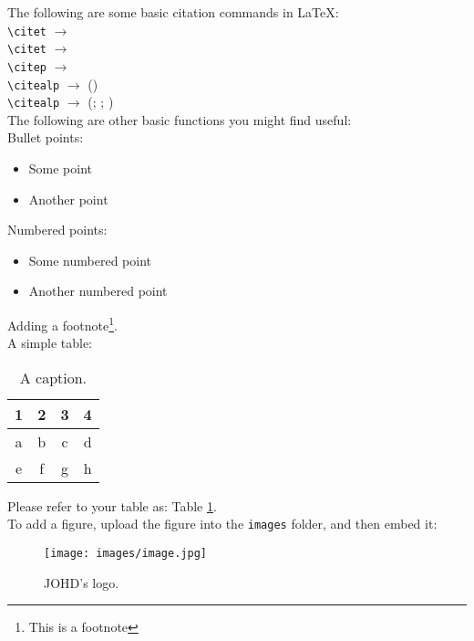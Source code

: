 \documentclass{article}
\begin{document}
\noindent The following are some basic citation commands in \LaTeX: \\

\noindent
\verb|\citet| $\rightarrow$ \citet{jenset&mcgil}\\
\verb|\citet| $\rightarrow$ \citet{shree-a}\\
\verb|\citep| $\rightarrow$ \citep{fabricius-hansen2012b}\\
\verb|\citealp| $\rightarrow$ (\citealp{eckhoff2018a})\\
\verb|\citealp| $\rightarrow$ (\citealp{eckhoff2018a}; \citealp{fabricius-hansen2012b}; \citealp{shree-a})\\

\noindent The following are other basic functions you might find useful:\\

\noindent Bullet points:
\begin{itemize}
    \item Some point
    \item Another point
\end{itemize}

\noindent Numbered points:
\begin{itemize}
    \item[1.] Some numbered point 
    \item[2.] Another numbered point
\end{itemize}

\noindent Adding a footnote\footnote{This is a footnote}. \\

\noindent A simple table:

\begin{table}[H]
\centering
\caption{\label{tab1} A caption.} %
\begin{tabular}{cccc}
\hline
1 & 2 & 3 & 4 \\
\hline
a & b & c & d\\
e & f & g & h\\
\hline
\end{tabular}
\end{table}

\noindent Please refer to your table as: Table \ref{tab1}. \\

\noindent To add a figure, upload the figure into the \texttt{images} folder, and then embed it:

\begin{figure}[H]
\centering
\texttt{[image: images/image.jpg]}
\caption{\label{fig1}JOHD's logo.}
\end{figure}
\end{document}
